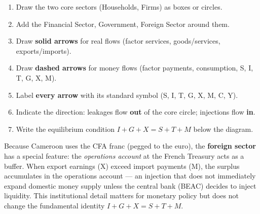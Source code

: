 \documentclass[11pt]{article}
\begin{document}
\begin{methode}
\begin{enumerate}
    \item Draw the two core sectors (Households, Firms) as boxes or circles.
    \item Add the Financial Sector, Government, Foreign Sector around them.
    \item Draw \textbf{solid arrows} for real flows (factor services, goods/services, exports/imports).
    \item Draw \textbf{dashed arrows} for money flows (factor payments, consumption, S, I, T, G, X, M).
    \item Label \textbf{every arrow} with its standard symbol (S, I, T, G, X, M, C, Y).
    \item Indicate the direction: leakages flow \textbf{out} of the core circle; injections flow \textbf{in}.
    \item Write the equilibrium condition $I+G+X = S+T+M$ below the diagram.
\end{enumerate}
\end{methode}

\begin{savaistu}
Because Cameroon uses the CFA franc (pegged to the euro), the \textbf{foreign sector} has a special feature: the \emph{operations account} at the French Treasury acts as a buffer. When export earnings (X) exceed import payments (M), the surplus accumulates in the operations account — an injection that does not immediately expand domestic money supply unless the central bank (BEAC) decides to inject liquidity. This institutional detail matters for monetary policy but does not change the fundamental identity $I+G+X = S+T+M$.
\end{savaistu}
\end{document}
